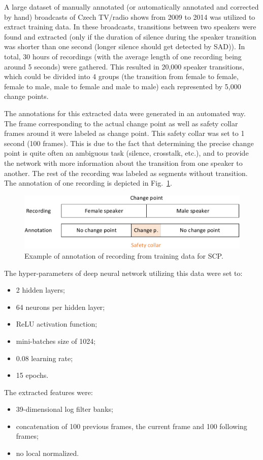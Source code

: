 \documentclass[FM,noheader,EN,bwtitles]{tulthesis}
\begin{document}
A large dataset of manually annotated (or automatically annotated and corrected by hand) broadcasts of Czech TV/radio shows from 2009 to 2014 was utilized to extract training data.
In these broadcasts, transitions between two speakers were found and extracted (only if the duration of silence during the speaker transition was shorter than one second (longer silence should get detected by SAD)).
In total, 30 hours of recordings (with the average length of one recording being around 5 seconds) were gathered.
This resulted in 20,000 speaker transitions, which could be divided into 4 groups (the transition from female to female, female to male, male to female and male to male) each represented by 5,000 change points.

The annotations for this extracted data were generated in an automated way.
The frame corresponding to the actual change point as well as safety collar frames around it were labeled as change point.
This safety collar was set to 1 second (100 frames).
This is due to the fact that determining the precise change point is quite often an ambiguous task (silence, crosstalk, etc.), and to provide the network with more information about the transition from one speaker to another.
The rest of the recording was labeled as segments without transition.
The annotation of one recording is depicted in Fig.~\ref{fig:SCP}.

\begin{figure}[ht]
\centering
\includegraphics[scale=0.8]{img/scp-data.pdf}
\caption{{Example of annotation of recording from training data for SCP.}}
\label{fig:SCP}
\end{figure}

The hyper-parameters of deep neural network utilizing this data were set to:
\begin{itemize}
	\item 2 hidden layers;
	\item 64 neurons per hidden layer;
	\item ReLU activation function;
	\item mini-batches size of 1024;
	\item 0.08 learning rate;
	\item 15 epochs.
\end{itemize}
The extracted features were:
\begin{itemize}
	\item 39-dimensional log filter banks; 
	\item concatenation of 100 previous frames, the current frame and 100 following frames;
	\item no local normalized.
\end{itemize}
\end{document}

